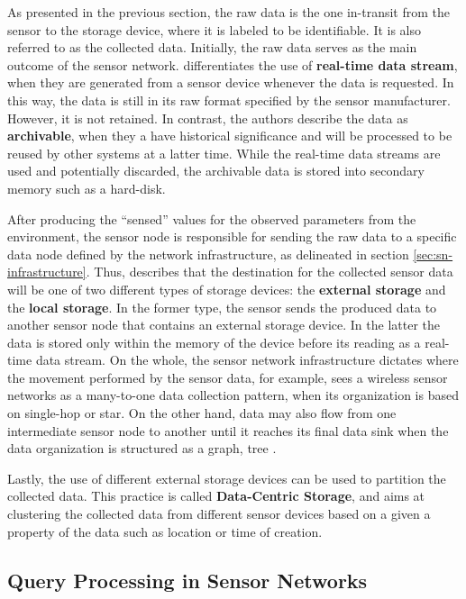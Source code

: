 As presented in the previous section, the raw data is the one in-transit from
the sensor to the storage device, where it is labeled to be
identifiable. It is also referred to as the collected data. 
Initially, the raw data serves as the main outcome of the sensor network.
\cite{sn-provenance} differentiates the use of \textbf{real-time data stream}, when they are generated from a sensor
device whenever the data is requested. In this way, the data is still in its raw
format specified by the sensor manufacturer. However, it is not retained. 
In contrast, the authors describe the data as \textbf{archivable}, when they a
have historical significance and will be processed to be reused by other systems at
a latter time. While the real-time data streams are used and potentially
discarded, the archivable data is stored into secondary memory such as a
hard-disk.

After producing the ``sensed'' values for the observed parameters from the
environment, the sensor node is responsible for sending the raw data to a specific
data node defined by the network infrastructure, as delineated in section
\ref{sec:sn-infrastructure}. Thus, \cite{sn-storage03}
describes that the destination for the collected sensor data will be one of two
different types of storage devices: the \textbf{external storage} and the
\textbf{local storage}. In the former type, the sensor sends the
produced data to another sensor node that contains an external storage device.
In the latter the data is stored only within the memory of the device before its 
reading as a real-time data stream. On the whole, the sensor network
infrastructure dictates where the movement performed by the sensor data,
for example, \cite{sn-storage02} sees a wireless sensor networks as a many-to-one data
collection pattern, when its organization is based on single-hop or star. On
the other hand, data may also flow from one intermediate sensor node to another
until it reaches its final data sink when the data organization is structured
as a graph, tree \cite{sn-storage01, sn-storage03}.

Lastly, the use of different external storage devices can be used
to partition the collected data. This practice is called \textbf{Data-Centric
Storage}, and aims at clustering the collected data from different sensor
devices based on a given a property of the data such as location or time of
creation.

\subsection{Query Processing in Sensor Networks}
\label{sec:query-process}

